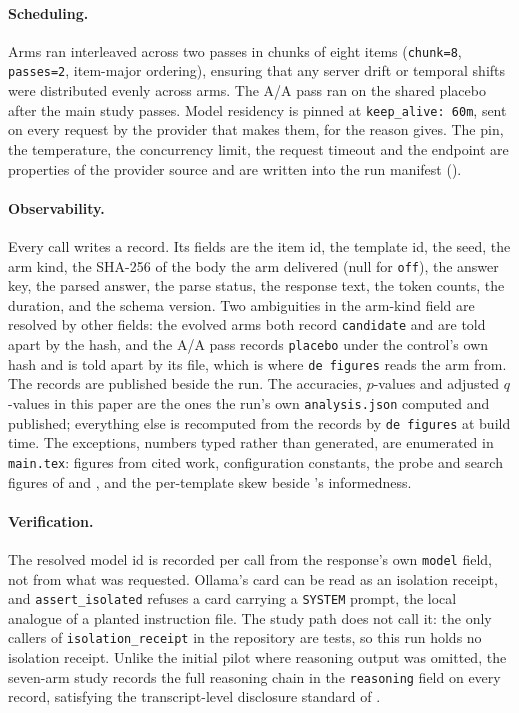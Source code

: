 \paragraph{Scheduling.} Arms ran interleaved across two passes in chunks of
eight items (\texttt{chunk=8}, \texttt{passes=2}, item-major ordering), ensuring
that any server drift or temporal shifts were distributed evenly across arms.
The A/A pass ran on the shared placebo after the main study passes. Model
residency is pinned at \texttt{keep\_alive: 60m}, sent on every request by the
provider that makes them, for the reason  gives. The pin,
the temperature, the concurrency limit, the request timeout and the endpoint
are properties of the provider source and are written into the run manifest
().

\paragraph{Observability.} Every call writes a record. Its fields are the
item id, the template id, the seed, the arm kind, the SHA-256 of the body
the arm delivered (null for \texttt{off}), the answer key, the parsed
answer, the parse status, the response text, the token counts, the duration,
and the schema version. Two ambiguities in the arm-kind field are resolved
by other fields: the evolved arms both record \texttt{candidate} and are
told apart by the hash, and the A/A pass records \texttt{placebo} under the
control's own hash and is told apart by its file, which is where
\texttt{de figures} reads the arm from. The records are published beside the
run. The accuracies, $p$-values and adjusted $q$-values in this paper are
the ones the run's own \texttt{analysis.json} computed and published;
everything else is recomputed from the records by \texttt{de figures} at
build time. The exceptions, numbers typed rather than generated, are
enumerated in \texttt{main.tex}: figures from cited work, configuration
constants, the probe and search figures of  and
, and the per-template skew beside
's informedness.

\paragraph{Verification.} The resolved model id is recorded per call from
the response's own \texttt{model} field, not from what was requested.
Ollama's  card can be read as an isolation receipt, and
\texttt{assert\_isolated} refuses a card carrying a \texttt{SYSTEM} prompt,
the local analogue of a planted instruction file. The study path does not
call it: the only callers of \texttt{isolation\_receipt} in the repository
are tests, so this run holds no isolation receipt. Unlike the initial pilot
where reasoning output was omitted, the seven-arm study records the full
reasoning chain in the \texttt{reasoning} field on every record, satisfying
the transcript-level disclosure standard of \citet{biderman2024lessons}.

